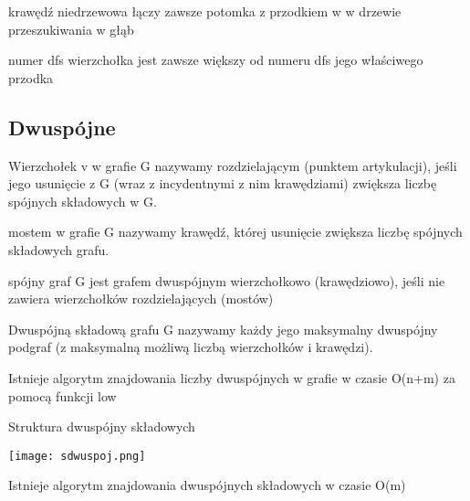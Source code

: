 \entry
krawędź niedrzewowa łączy zawsze potomka z przodkiem w
w drzewie przeszukiwania w głąb

\entry
numer dfs wierzchołka jest zawsze większy od numeru dfs jego
właściwego przodka

\subsection{Dwuspójne}

\entry
Wierzchołek v w grafie G nazywamy rozdzielającym (punktem artykulacji), jeśli jego usunięcie z G
(wraz z incydentnymi z nim krawędziami) zwiększa liczbę spójnych składowych w G.

\entry 
mostem w grafie G nazywamy krawędź, której usunięcie zwiększa liczbę spójnych składowych grafu.

\entry
spójny graf G jest grafem dwuspójnym wierzchołkowo (krawędziowo), jeśli nie zawiera wierzchołków
rozdzielających (mostów)

\entry
Dwuspójną składową grafu G nazywamy każdy jego maksymalny dwuspójny podgraf (z maksymalną możliwą liczbą
wierzchołków i krawędzi).

\entry 
Istnieje algorytm znajdowania liczby dwuspójnych w grafie w czasie O(n+m) za pomocą funkcji low

\entry
Struktura dwuspójny składowych

\texttt{[image: sdwuspoj.png]}

\entry
Istnieje algorytm znajdowania dwuspójnych składowych w czasie O(m)


